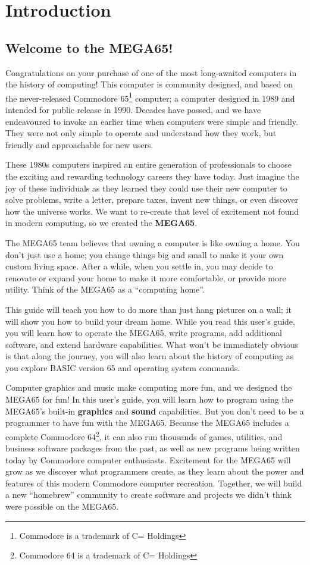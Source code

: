 \chapter{Introduction}


\section{Welcome to the MEGA65!}

Congratulations on your purchase of one of the most long-awaited computers in the history of computing! This computer is community designed, and based on the never-released Commodore{\textregistered} 65\footnote{Commodore is a trademark of C= Holdings} computer; a computer designed in 1989 and intended for public release in 1990. Decades have passed, and we have endeavoured to invoke an earlier time when computers were simple and friendly. They were not only simple to operate and understand how they work, but friendly and approachable for new users.

These 1980s computers inspired an entire generation of professionals to choose the exciting and rewarding technology careers they have today. Just imagine the joy of these individuals as they learned they could use their new computer to solve problems, write a letter, prepare taxes, invent new things, or even discover how the universe works. We want to re-create that level of excitement not found in modern computing, so we created the {\bf MEGA65}.

The MEGA65 team believes that owning a computer is like owning a home. You don't just use a home; you change things big and small to make it your own custom living space. After a while, when you settle in, you may decide to renovate or expand your home to make it more comfortable, or provide more utility. Think of the MEGA65 as a ``computing home''.

This guide will teach you how to do more than just hang pictures on a wall; it will show you how to build your dream home. While you read this user's guide, you will learn how to operate the MEGA65, write programs, add additional software, and extend hardware capabilities. What won't be immediately obvious is that along the journey, you will also learn about the history of computing as you explore BASIC version 65 and operating system commands.

Computer graphics and music make computing more fun, and we designed the MEGA65 for fun! In this user's guide, you will learn how to program using the MEGA65's built-in {\bf graphics} and {\bf sound} capabilities. But you don't need to be a programmer to have fun with the MEGA65. Because the MEGA65 includes a complete Commodore{\textregistered} 64{\texttrademark}\footnote{Commodore 64 is a trademark of C= Holdings}, it can also run thousands of games, utilities, and business software packages from the past, as well as new programs being written today by Commodore computer enthusiasts. Excitement for the MEGA65 will grow as we discover what programmers create, as they learn about the power and features of this modern Commodore computer recreation. Together, we will build a new ``homebrew'' community to create software and projects we didn't think were possible on the MEGA65.

